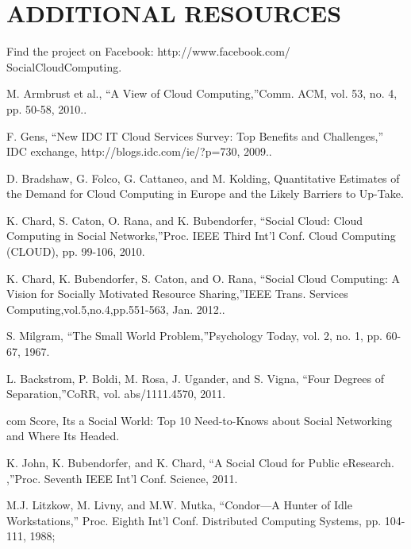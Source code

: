\documentclass[a4paper,12pt]{article}
\begin{document}
	\section {ADDITIONAL RESOURCES}
	Find the project on Facebook: http://www.facebook.com/
SocialCloudComputing.

    \renewcommand{\bibsection}{\section{\refname}}
    

    \begin{thebibliography}{99}

         {M. Armbrust et al., “A View of Cloud Computing,”Comm. ACM,
vol. 53, no. 4, pp. 50-58, 2010..}

         {F. Gens, “New IDC IT Cloud Services Survey: Top Benefits and
Challenges,” IDC exchange, http://blogs.idc.com/ie/?p=730,
2009..}

         {D. Bradshaw, G. Folco, G. Cattaneo, and M. Kolding,
Quantitative Estimates of the Demand for Cloud Computing in
Europe and the Likely Barriers to Up-Take.}

         {K. Chard, S. Caton, O. Rana, and K. Bubendorfer, “Social Cloud:
Cloud Computing in Social Networks,”Proc. IEEE Third Int’l Conf.
Cloud Computing (CLOUD), pp. 99-106, 2010.}

         {K. Chard, K. Bubendorfer, S. Caton, and O. Rana, “Social
Cloud Computing: A Vision for Socially Motivated Resource
Sharing,”IEEE Trans. Services Computing,vol.5,no.4,pp.551-563, Jan. 2012..}

         {S. Milgram, “The Small World Problem,”Psychology Today, vol. 2,
no. 1, pp. 60-67, 1967.}

         {L. Backstrom, P. Boldi, M. Rosa, J. Ugander, and S. Vigna, “Four
Degrees of Separation,”CoRR, vol. abs/1111.4570, 2011.}

         {com Score,  Its a Social World: Top 10 Need-to-Knows
about Social Networking and Where Its Headed.}

         { K. John, K. Bubendorfer, and K. Chard, “A Social Cloud for Public
eResearch. ,”Proc. Seventh IEEE Int’l Conf. Science, 2011.}

         {M.J. Litzkow, M. Livny, and M.W. Mutka, “Condor—A Hunter of
Idle Workstations,” Proc. Eighth Int’l Conf. Distributed Computing
Systems, pp. 104-111, 1988;}


\end{thebibliography}
\end{document}
